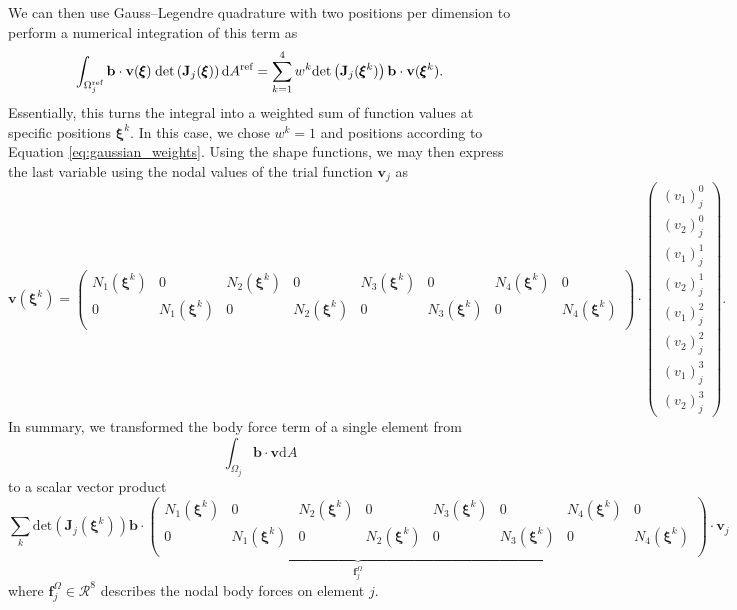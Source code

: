 We can then use Gauss–Legendre quadrature with two positions per dimension to perform a numerical integration of this term as
\begin{equation}
    \int_{\Omega_j^\textrm{ref}} \mathbf{b} \cdot \mathbf{v}(\pmb{\xi}) \hspace{0.25em}\text{det}\left(\mathbf{J}_j(\pmb{\xi})\right)\text{d}A^\textrm{ref}
    = \sum_{k=1}^4 w^k \text{det}\left(\mathbf{J}_j(\pmb{\xi}^k)\right) \mathbf{b} \cdot \mathbf{v}(\pmb{\xi}^k).
\end{equation}
Essentially, this turns the integral into a weighted sum of function values at specific positions $\pmb{\xi}^k$. In this case, we chose $w^k=1$ and positions according to Equation \eqref{eq:gaussian_weights}.
Using the shape functions, we may then express the last variable using the nodal values of the trial function $\mathbf{v}_j$ as  
\setlength\arraycolsep{-2pt}
\begin{equation}
    \mathbf{v}(\pmb{\xi}^k) 
    =
    \begin{pmatrix}
            N_1(\pmb{\xi}^k) & 0 & N_2(\pmb{\xi}^k) & 0 & N_3(\pmb{\xi}^k) & 0 & N_4(\pmb{\xi}^k) & 0\\
            0 & N_1(\pmb{\xi}^k) & 0 & N_2(\pmb{\xi}^k) & 0 & N_3(\pmb{\xi}^k) & 0 & N_4(\pmb{\xi}^k)\\
    \end{pmatrix}
    \cdot 
    \begin{pmatrix}
            {(v_1)}_j^0 \\
            {(v_2)}_j^0 \\
            {(v_1)}_j^1 \\
            {(v_2)}_j^1 \\
            {(v_1)}_j^2 \\
            {(v_2)}_j^2 \\
            {(v_1)}_j^3 \\
            {(v_2)}_j^3 
    \end{pmatrix}.
    \label{eq:shape_interpolation}
\end{equation}
\setlength\arraycolsep{5pt}
In summary, we transformed the body force term of a single element from 
\begin{equation}
    \int_{\Omega_j} \mathbf{b} \cdot \mathbf{v} \text{d}A  
\end{equation}
to a scalar vector product 
\setlength\arraycolsep{-5pt}
\begin{equation}
    \underbrace{\sum_k \text{det}\left(\mathbf{J}_j(\pmb{\xi}^k)\right) \mathbf{b} \cdot
    \begin{pmatrix}
            N_1(\pmb{\xi}^k) & 0 & N_2(\pmb{\xi}^k) & 0 & N_3(\pmb{\xi}^k) & 0 & N_4(\pmb{\xi}^k) & 0\\
            0 & N_1(\pmb{\xi}^k) & 0 & N_2(\pmb{\xi}^k) & 0 & N_3(\pmb{\xi}^k) & 0 & N_4(\pmb{\xi}^k)\\
    \end{pmatrix}}_{\mathbf{f}^\Omega_j}
    \cdot 
    \mathbf{v}_j
\end{equation}
\setlength\arraycolsep{5pt}
where $\mathbf{f}^\Omega_j \in \mathcal{R}^8$ describes the nodal body forces on element $j$. 

